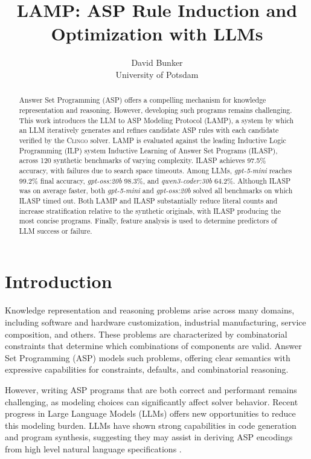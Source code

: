 \documentclass[11pt,a4paper]{article}
\begin{document}
\title{LAMP: ASP Rule Induction and Optimization with LLMs}

\author{David Bunker \\ University of Potsdam}

\date{}
\maketitle

\thispagestyle{plain}
\pagestyle{plain}

\begin{abstract}
Answer Set Programming (ASP) offers a compelling mechanism for knowledge representation and reasoning. However, developing such programs remains challenging. This work introduces the LLM to ASP Modeling Protocol (LAMP), a system by which an LLM iteratively generates and refines candidate ASP rules with each candidate verified by the \textsc{Clingo} solver. LAMP is evaluated against the leading Inductive Logic Programming (ILP) system Inductive Learning of Answer Set Programs (ILASP), across 120 synthetic benchmarks of varying complexity. ILASP achieves 97.5\% accuracy, with failures due to search space timeouts. Among LLMs, \textit{gpt-5-mini} reaches 99.2\% final accuracy, \textit{gpt-oss:20b} 98.3\%, and \textit{qwen3-coder:30b} 64.2\%. Although ILASP was on average faster, both \textit{gpt-5-mini} and \textit{gpt-oss:20b} solved all benchmarks on which ILASP timed out. Both LAMP and ILASP substantially reduce literal counts and increase stratification relative to the synthetic originals, with ILASP producing the most concise programs. Finally, feature analysis is used to determine predictors of LLM success or failure.
\end{abstract}

\section{Introduction}

Knowledge representation and reasoning problems arise across many domains, including software and hardware customization, industrial manufacturing, service composition, and others. These problems are characterized by combinatorial constraints that determine which combinations of components are valid. Answer Set Programming (ASP) models such problems, offering clear semantics with expressive capabilities for constraints, defaults, and combinatorial reasoning.

However, writing ASP programs that are both correct and performant remains challenging, as modeling choices can significantly affect solver behavior. Recent progress in Large Language Models (LLMs) offers new opportunities to reduce this modeling burden. LLMs have shown strong capabilities in code generation and program synthesis, suggesting they may assist in deriving ASP encodings from high level natural language specifications \cite{ishay2023leveraginglargelanguagemodels}.
\end{document}
